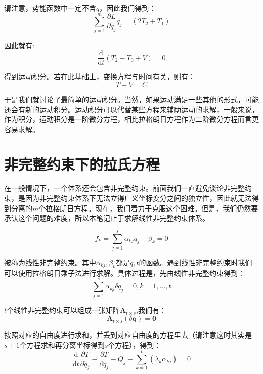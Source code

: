 \documentclass[a4paper, 10pt, openany]{book}%
\begin{document}
请注意，势能函数中一定不含$\dot{q}$，因此我们得到：
\begin{equation}
\sum_{j=1}^m\frac{\partial L}{\partial \dot{q}_j}\dot{q}_j=(2T_2+T_1)
\end{equation}

因此就有:
\begin{equation}
\frac{\mathrm{d}}{\mathrm{d}t}\left(T_2-T_0+V\right)=0
\end{equation}

得到运动积分。若在此基础上，变换方程与时间有关，则有：
    \begin{equation}T+V=C\end{equation}

    于是我们就讨论了最简单的运动积分。当然，如果运动满足一些其他的形式，可能还会有新的运动积分。运动积分可以代替某些方程来辅助运动的求解，一般来说，作为积分，运动积分是一阶微分方程，相比拉格朗日方程作为二阶微分方程而言更容易求解。
   
 \section{非完整约束下的拉氏方程}

  在一般情况下，一个体系还会包含非完整约束。前面我们一直避免谈论非完整约束，是因为非完整约束体系下无法立得广义坐标变分之间的独立性，因此就无法得到分离的$m$个拉格朗日方程。现在，我们着力于克服这个困难。但是，我们仍然要承认这个问题的难度，所以本笔记止于求解线性非完整约束体系。

    \begin{equation}f_k=\sum_{j=1}^s\alpha_{kj}\dot{q}_j+\beta_k=0\end{equation}

    被称为线性非完整约束。其中$\alpha_{kj},\beta_k$都是$q,t$的函数。遇到线性非完整约束时我们可以使用拉格朗日乘子法进行求解。具体过程是，先由线性非完整约束得到：
    \begin{equation}\sum_{j=1}^s \alpha_{kj}\delta q_j=0,k=1,\dots,t\end{equation}

    $t$个线性非完整约束可以组成一张矩阵$\textbf{A}_{t\times s}$,我们有：
    $$\textbf{A}_{t\times s}(\delta\textbf{q})=\textbf{0}$$

    按照对应的自由度进行求和，并丢到对应自由度的方程里去（请注意这时其实是$s+1$个方程求和再分离坐标得到$s$个方程），得到：
    \begin{equation}\frac{\mathrm{d}}{\mathrm{d}t}\frac{\partial T}{\partial \dot{q}_j}-\frac{\partial T}{\partial q_j}-Q_j-\sum_{k=1}^t(\lambda_k\alpha_{kj})=0\end{equation}
\end{document}
